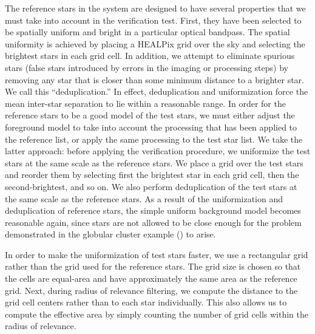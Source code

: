 The reference stars in the \an system are designed to have several
properties that we must take into account in the verification test.
First, they have been selected to be spatially uniform and bright in a
particular optical bandpass.  The spatial uniformity is achieved by
placing a HEALPix \cite{healpix} grid over the sky and selecting the
brightest stars in each grid cell.  In addition, we attempt to
eliminate spurious stars (false stars introduced by errors in the
imaging or processing steps) by removing any star that is closer than
some minimum distance to a brighter star.  We call this
``deduplication.''  In effect, deduplication and uniformization force
the mean inter-star separation to lie within a reasonable range.  In
order for the reference stars to be a good model of the test stars, we
must either adjust the foreground model to take into account the
processing that has been applied to the reference list, or apply the
same processing to the test star list.  We take the latter approach:
before applying the verification procedure, we uniformize the test
stars at the same scale as the reference stars.  We place a grid over
the test stars and reorder them by selecting first the brightest star
in each grid cell, then the second-brightest, and so on.  We also
perform deduplication of the test stars at the same scale as the
reference stars.  As a result of the uniformization and deduplication
of reference stars, the simple uniform background model becomes
reasonable again, since stars are not allowed to be close enough for
the problem demonstrated in the globular cluster example
() to arise.




In order to make the uniformization of test stars faster, we use a
rectangular grid rather than the \healpix grid used for the reference
stars.  The grid size is chosen so that the cells are equal-area and
have approximately the same area as the reference grid.  Next, during
radius of relevance filtering, we compute the distance to the grid
cell centers rather than to each star individually.  This also allows
us to compute the effective area by simply counting the number of grid
cells within the radius of relevance.


